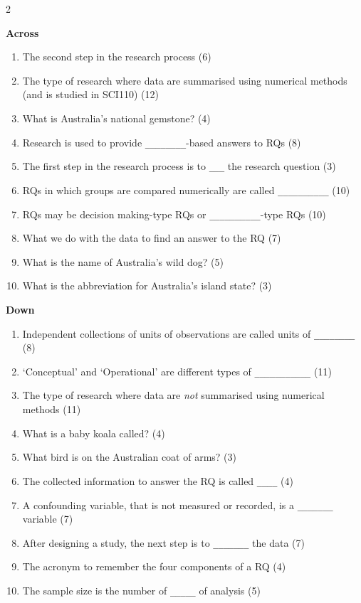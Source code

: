 \documentclass[
  11pt,
  a4paper,
  krantz2]{krantz}
\providecommand{\tightlist}{%
  \setlength{\itemsep}{0pt}\setlength{\parskip}{0pt}}
\begin{document}
\begin{multicols}{2}\small

\textbf{Across}
\begin{enumerate}\tightlist
  \item[\textbf{2.}]
  The second step in the research process (6)  
  \item[\textbf{3.}]
  The type of research where data are summarised using numerical methods (and is studied in SCI110) (12)
  \item[\textbf{5.}]
  What is Australia's national gemstone? (4)  
  \item[\textbf{6.}]
  Research is used to provide \verb|________|-based answers to RQs (8)  
  \item[\textbf{7.}] 
  The first step in the research process is to \verb|___| the research question (3)  
  \item[\textbf{9.}]
  RQs in which groups are compared numerically are called \verb|__________| (10)  
  \item[\textbf{12.}]
  RQs may be decision making-type RQs or \verb|__________|-type RQs (10)  
  \item[\textbf{15.}]
  What we do with the data to find an answer to the RQ (7)  
  \item[\textbf{16.}] 
  What is the name of Australia's wild dog? (5)
  \item[\textbf{17.}] 
  What is the abbreviation for Australia's island state? (3)
\end{enumerate}

\columnbreak

\textbf{Down}
\begin{enumerate}\tightlist
  \item[\textbf{1.}]
  Independent collections of units of observations are called units of \verb|________| (8)
  \item[\textbf{2.}]
  `Conceptual' and `Operational' are different types of \verb|___________| (11)  
  \item[\textbf{3.}]
  The type of research where data are \emph{not} summarised using numerical methods (11)  
  \item[\textbf{4.}] 
  What is a baby koala called? (4)
  \item[\textbf{6.}]
  What bird is on the Australian coat of arms? (3)
  \item[\textbf{8.}]
  The collected information to answer the RQ is called \verb|____| (4)  
  \item[\textbf{10.}]
  A confounding variable, that is not measured or recorded, is a \verb|_______| variable (7)
  \item[\textbf{11.}]
  After designing a study, the next step is to \verb|_______| the data (7)  
  \item[\textbf{13.}]
  The acronym to remember the four components of a RQ (4)
  \item[\textbf{14.}]
  The sample size is the number of \verb|_____| of analysis (5)
\end{enumerate}
\end{multicols}
\end{document}
